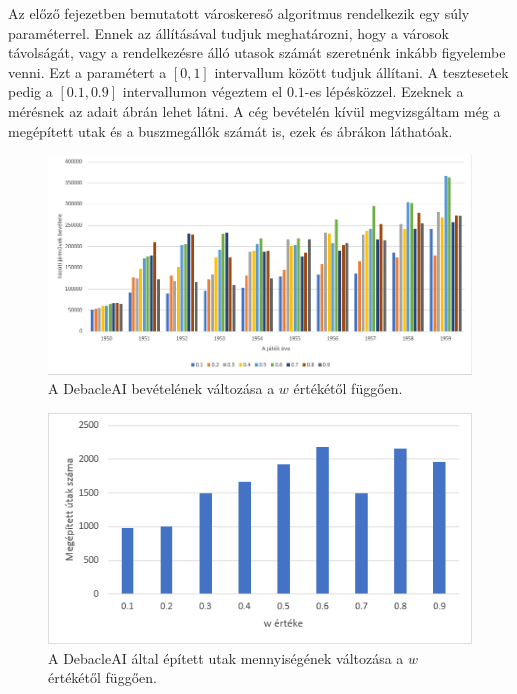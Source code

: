 
Az előző fejezetben bemutatott városkereső algoritmus rendelkezik egy súly paraméterrel. Ennek az állításával tudjuk meghatározni, hogy a városok távolságát, vagy a rendelkezésre álló utasok számát szeretnénk inkább figyelembe venni.  Ezt a paramétert a $[0,1]$ intervallum között tudjuk állítani. A tesztesetek pedig a $[0.1,0.9]$ intervallumon végeztem el $0.1$-es lépésközzel. Ezeknek a mérésnek az adait  ábrán lehet látni. A cég bevételén kívül megvizsgáltam még a megépített utak és a buszmegállók számát is, ezek  és  ábrákon láthatóak.

\begin{figure}
	\centering
	\includegraphics[scale=0.6]{images/wmeresek.png}
	\caption{A DebacleAI bevételének változása a $w$ értékétől függően.}
	\label{fig:meresek}
\end{figure}

\begin{figure}
	\centering
	\includegraphics[scale=1]{images/wutak.png}
	\caption{A DebacleAI által épített utak mennyiségének változása a $w$ értékétől függően.}
	\label{fig:utak}
\end{figure}

